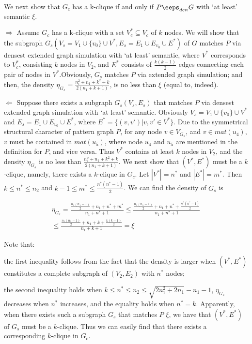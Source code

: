 We next show that $G_c$ has a k-clique if and only if $P \eeps_{den} G$ with `at least' semantic \wrt $\xi$.

\stab
{$\Rightarrow$}
Assume $G_c$ has a k-clique with a set $V_c^* \subseteq V_c$ of $k$ nodes. We will show that the subgraph $G_s(V_s=V_1\cup\{v_0\}\cup V^*, E_s=E_1\cup E_{v_0}\cup E^*)$ of $G$ matches $P$ via densest extended graph simulation with `at least' semantic, where $V^*$ corresponds to $V_c^*$, consisting $k$ nodes in $V_2$, and $E^*$ consists of $\frac{k(k-1)}{2}$ edges connecting each pair of nodes in $V^*$.Obviously, $G_s$ matches $P$ via extended graph simulation; and then, the density $\eta_{G_s}=\frac{n_1^2+n_1+k^2+k}{2(n_1+k+1)}$, is no less than $\xi$ (equal to, indeed).

\stab
{$\Leftarrow$}
Suppose there exists a subgraph $G_s(V_s,E_s)$ that matches $P$ via densest extended graph simulation with `at least' semantic. Obviously $V_s=V_1\cup\{v_0\}\cup V^*$ and $E_s=E_1\cup E_{v_0}\cup E^*$, where $E^*=\{(v,v')|v,v'\in V^*\}$. Due to the symmetrical structural character of pattern graph $P$, for any node $v \in V_{G_s}$, and $v \in mat(u_4)$, $v$ must be contained in $mat(u_5)$, where node $u_4$ and $u_5$ are mentioned in the definition for $P$, and vice versa. Thus $V^*$ contains at least $k$ nodes in $V_2$, and the density $\eta_{G_s}$ is no less than $\frac{n_1^2+n_1+k^2+k}{2(n_1+k+1)}$. We next show that $(V^*,E^*)$ must be a $k$-clique, namely, there exists a $k$-clique in $G_c$.
Let $|V^*|=n^*$ and $|E^*|=m^*$. Then $k \leq n^* \leq n_2$ and $k-1 \leq m^* \leq \frac{n^*(n^*-1)}{2}$. We can find the density of $G_s$ is


\[\begin{split}
\eta_{G_s} =
\frac{\frac{n_1(n_1-1)}{2}+n_1+n^*+m^*}{n_1+n^*+1} \leq \frac{\frac{n_1(n_1-1)}{2}+n_1+ n^* +
  \frac{n^*(n^*-1)}{2}}{n_1+n^*+1}\\
  \leq \frac{\frac{n_1(n_1-1)}{2} + n_1 + k + \frac{k(k-1)}{2}}{n_1 + k + 1} = \xi
\end{split}\]


Note that:
\be
\item the first inequality follows from the fact that the density is larger when $(V^*,E^*)$ constitutes a complete subgraph of $(V_2,E_2)$ with $n^*$ nodes;
\item the second inequality holds when $k \leq n^* \leq n_2 \leq \sqrt{2n_1^2+2n_1}-n_1-1$, $\eta_{G_s}$ decreases when $n^*$ increases, and the equality holds when $n^*=k$.
\ee
Apparently, when there exists such a subgraph $G_s$ that matches $P$ \wrt $\xi$, we have that $(V^*,E^*)$ of $G_s$ must be a $k$-clique. Thus we can easily find that there exists a corresponding $k$-clique in $G_c$.



